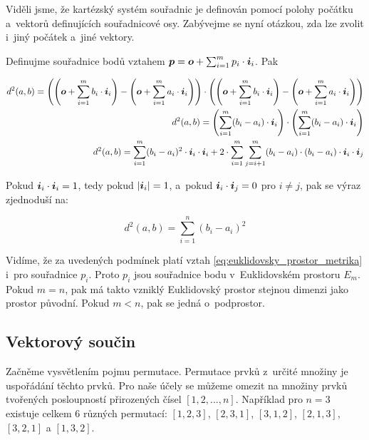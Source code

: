 Viděli jsme, že kartézský systém souřadnic je definován pomocí polohy počátku a~vektorů definujících souřadnicové osy. Zabývejme se nyní otázkou, zda lze zvolit i~jiný počátek a~jiné vektory.

Definujme souřadnice bodů vztahem \(\boldsymbol{p} = \boldsymbol{o} + \sum_{i=1}^m p_i \cdot \boldsymbol{i}_i\). Pak

\begin{equation}
\begin{split}
d^2(a, b) = \left( \left( \boldsymbol{o} + \sum_{i=1}^m b_i \cdot \boldsymbol{i}_i \right) - \left( \boldsymbol{o} + \sum_{i=1}^m a_i \cdot \boldsymbol{i}_i \right) \right) \cdot \left(
\left( \boldsymbol{o} + \sum_{i=1}^m b_i \cdot \boldsymbol{i}_i \right) - \left( \boldsymbol{o} + \sum_{i=1}^m a_i \cdot \boldsymbol{i}_i \right) \right) \\
d^2(a, b) = \left(\sum_{i=1}^m (b_i - a_i) \cdot \boldsymbol{i}_i \right) \cdot \left(\sum_{i=1}^m (b_i - a_i) \cdot \boldsymbol{i}_i \right) \\
d^2(a, b) = \sum_{i=1}^m (b_i - a_i)^2 \cdot \boldsymbol{i}_i \cdot \boldsymbol{i}_i + 2 \cdot \sum_{i=1}^m \sum_{j=i + 1}^m (b_i - a_i) \cdot (b_i - a_i) \cdot \boldsymbol{i}_i \cdot \boldsymbol{i}_j
\end{split}
\end{equation}

Pokud \(\boldsymbol{i}_i \cdot \boldsymbol{i}_i = 1\), tedy pokud \(|\boldsymbol{i}_i| = 1\), a~pokud \(\boldsymbol{i}_i \cdot \boldsymbol{i}_j = 0\) pro \(i \neq j\), pak se výraz zjednoduší na:

\begin{equation}
d^2(a, b) = \sum_{i=1}^n (b_i - a_i)^2
\end{equation}

Vidíme, že za uvedených podmínek platí vztah \eqref{eq:euklidovsky_prostor_metrika} i~pro souřadnice \(p_i\). Proto \(p_i\) jsou souřadnice bodu v~Euklidovském prostoru \(E_m\). Pokud \(m = n\), pak má takto vzniklý Euklidovský prostor stejnou dimenzi jako prostor původní. Pokud \(m < n\), pak se jedná o~podprostor.

\subsection{Vektorový součin}

Začněme vysvětlením pojmu permutace. Permutace prvků z~určité množiny je uspořádání těchto prvků. Pro naše účely se můžeme omezit na množiny prvků tvořených posloupností přirozených čísel \([1, 2, ..., n]\). Například pro \(n = 3\) existuje celkem 6 různých permutací: \([1, 2, 3]\), \([2, 3, 1]\), \([3, 1, 2]\), \([2, 1, 3]\), \([3, 2, 1]\) a \([1, 3, 2]\).

